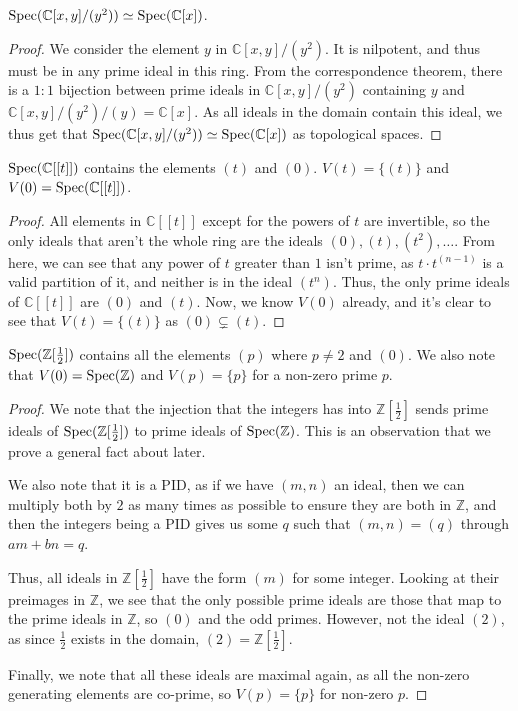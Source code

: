 \begin{example}
    $\operatorname{Spec} (\mathbb{C}[x,y]/(y^2)) \simeq \operatorname{Spec} (\mathbb{C}[x])$. 
\end{example}
\begin{proof}
    We consider the element $y$ in $\mathbb{C}[x,y]/(y^2)$. It is nilpotent, and thus must be in any prime ideal in this ring. From the correspondence theorem, there is a $1:1$ bijection between prime ideals in $\mathbb{C}[x,y]/(y^2)$ containing $y$ and $\mathbb{C}[x,y]/(y^2)/(y) = \mathbb{C}[x]$. As all ideals in the domain contain this ideal, we thus get that $\operatorname{Spec} (\mathbb{C}[x,y]/(y^2)) \simeq \operatorname{Spec} (\mathbb{C}[x])$ as topological spaces. 
\end{proof}
\begin{example}
    $\operatorname{Spec} (\mathbb{C}[[t]])$ contains the elements $(t)$ and $(0)$. $V(t) = \{(t)\}$ and $V(0) = \operatorname{Spec} (\mathbb{C}[[t]])$.
\end{example}
\begin{proof}
    All elements in $\mathbb{C}[[t]]$ except for the powers of $t$ are invertible, so the only ideals that aren't the whole ring are the ideals $(0), (t), (t^2), \ldots$. From here, we can see that any power of $t$ greater than $1$ isn't prime, as $t\cdot t^{(n-1)}$ is a valid partition of it, and neither is in the ideal $(t^n)$. Thus, the only prime ideals of $\mathbb{C}[[t]]$ are $(0)$ and $(t)$. Now, we know $V(0)$ already, and it's clear to see that $V(t) = \{(t)\}$ as $(0) \subsetneq (t)$.
\end{proof}
\begin{example}
    $\operatorname{Spec} (\mathbb{Z}[\frac{1}{2}])$ contains all the elements $(p)$ where $p \neq 2$ and $(0)$. We also note that $V(0) = \operatorname{Spec} (\mathbb{Z})$ and $V(p) = \{p\}$ for a non-zero prime \(p\).
\end{example}
\begin{proof}
    We note that the injection that the integers has into $\mathbb{Z}[\frac{1}{2}]$ sends prime ideals of $\operatorname{Spec} (\mathbb{Z}[\frac{1}{2}])$ to prime ideals of $\operatorname{Spec} (\mathbb{Z})$. This is an observation that we prove a general fact about later. 
    
    We also note that it is a PID, as if we have $(m,n)$ an ideal, then we can multiply both by $2$ as many times as possible to ensure they are both in $\mathbb{Z}$, and then the integers being a PID gives us some $q$ such that $(m,n) = (q)$ through $am + bn = q$.

    Thus, all ideals in $\mathbb{Z}[\frac{1}{2}]$ have the form $(m)$ for some integer. Looking at their preimages in $\mathbb{Z}$, we see that the only possible prime ideals are those that map to the prime ideals in $\mathbb{Z}$, so $(0)$ and the odd primes. However, not the ideal $(2)$, as since $\frac{1}{2}$ exists in the domain, $(2) = \mathbb{Z}[\frac{1}{2}]$.

    Finally, we note that all these ideals are maximal again, as all the non-zero generating elements are co-prime, so $V(p) = \{p\}$ for non-zero $p$.
\end{proof}

